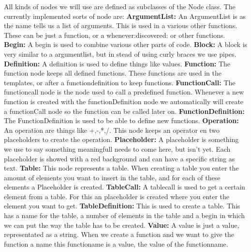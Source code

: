 \documentclass[a4paper,12pt]{report}
\begin{document}
All kinds of nodes we will use are defined as subclasses of the Node class. The currently implemented sorts of node are:
\newline\textbf{ArgumentList: } An ArgumentList is as the name tells us a list of arguments. This is used in a various other functions.
These can be just a function, or a whenever:discovered: or other functions.
\newline\textbf{Begin: } A begin is used to combine various other parts of code. 
\newline\textbf{Block: } A block is very similar to a argumentlist, but in stead of using curly braces we use pipes.
\newline\textbf{Definition: } A definition is used to define things like values.
\newline\textbf{Function: } The function node keeps all defined functions. These functions are used in the templates, or after a
functiondefinition to keep functions.
\newline\textbf{FunctionCall: }The functioncall node is the node used to call a predefined function. Whenever a new function is created with the functionDefinition node we automatically will create
a functionCall node so the function can be called later on.
\newline\textbf{FunctionDefinition: } The FunctionDefinition is used to be able to define new functions.
\newline\textbf{Operation: } An operation are things like +,-,*,/. This node keeps an operator en two placeholders to create the operation.
\newline\textbf{Placeholder: } A placeholder is something we use to say something meaningfull needs to come here, but isn't yet. Each placeholder is showed with a red background and can have a specific string as 
text.
\newline\textbf{Table: } This node represents a table. When creating a table you enter the amount of elements you want to insert in the table, and for each of these elements a Placeholder is created. 
\newline\textbf{TableCall: } A tablecall is used to get a certain element from a table. For this an placeholder is created where you enter the element you want to get.
\newline\textbf{TableDefinition: } This is used to create a table. This has a name for the table, a number of elements in the table and a begin in which we can put the way the table has to be created.
\newline\textbf{Value: } A value is just a value, representated as a string. When we create a function and we want to give the function a name this functioname is a value, the value of the functionname. 
\end{document}
